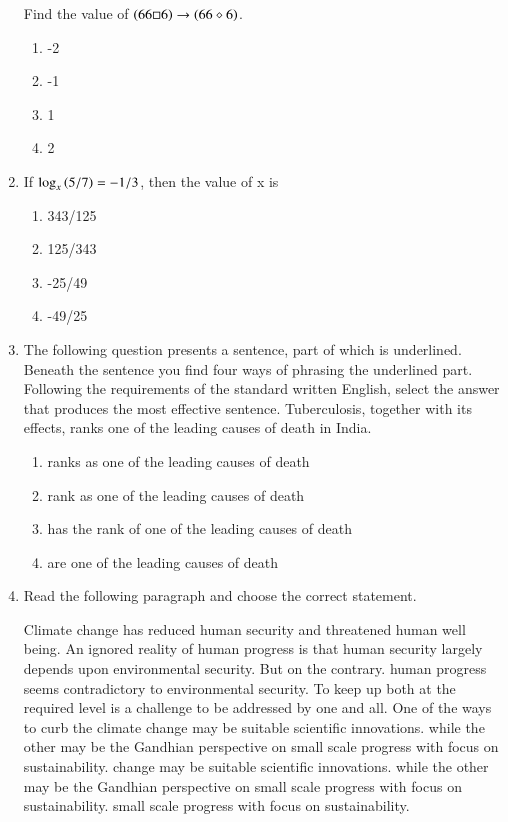 \documentclass[journal,12pt,onecolumn]{IEEEtran}
\theoremstyle{remark}
\begin{document}
\begin{enumerate}
    Find the value of $\left(66\square 6\right)\to \left(66\diamond 6\right)$.

\hfill{}
    \begin{enumerate}
        \item -2
         \item -1
          \item 1
           \item 2
    \end{enumerate}

    \item If $ \log_{x}\left(5/7\right) = -1/3$, then the value of x is

\hfill{}
\begin{enumerate}
    \item 343/125
     \item 125/343
      \item -25/49
       \item -49/25
\end{enumerate}

    \item The following question presents a sentence, part of which is underlined. Beneath the sentence you find four ways of phrasing the underlined part. Following the requirements of the standard written English, select the answer that produces the most effective sentence.
    Tuberculosis, together with its effects, ranks one of the leading causes of death in India.

\hfill{}
\begin{enumerate}
    \item ranks as one of the leading causes of death
     \item rank as one of the leading causes of death
      \item has the rank of one of the leading causes of death
       \item are one of the leading causes of death
\end{enumerate}

    \item Read the following paragraph and choose the correct statement.
    
Climate change has reduced human security and threatened human well being. An ignored reality 
of human progress is that human security largely depends upon environmental security. But on the 
contrary. human progress seems contradictory to environmental security. To keep up both at the 
required level is a challenge to be addressed by one and all. One of the ways to curb the climate change may be suitable scientific innovations. while the other may be the Gandhian perspective on small scale progress with focus on sustainability.
change may be suitable scientific innovations. while the other may be the Gandhian perspective on small scale progress with focus on sustainability.
small scale progress with focus on sustainability.


\end{enumerate}
\end{document}
